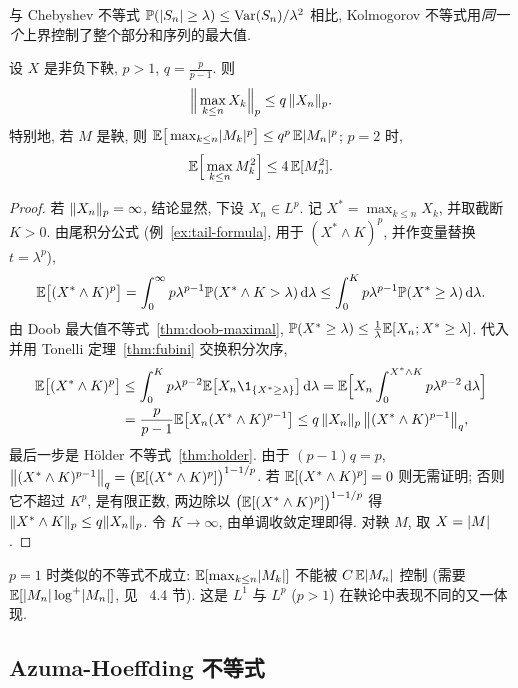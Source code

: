 与 Chebyshev 不等式 $\mathbb{P}(\lvert S_n\rvert\ge\lambda)\le\operatorname{Var}(S_n)/\lambda^2$ 相比, Kolmogorov 不等式用\emph{同一个}上界控制了整个部分和序列的最大值.

\begin{theorem}\label{thm:doob-Lp}
设 $X$ 是非负下鞅, $p>1$, $q=\frac{p}{p-1}$. 则
\[
\Big\|\max_{k\le n}X_k\Big\|_p\le q\,\lVert X_n\rVert_p.
\]
特别地, 若 $M$ 是鞅, 则 $\mathbb{E}\big[\max_{k\le n}\lvert M_k\rvert^p\big]\le q^p\,\mathbb{E}\lvert M_n\rvert^p$; $p=2$ 时,
\[
\mathbb{E}\Big[\max_{k\le n}M_k^2\Big]\le4\,\mathbb{E}[M_n^2].
\]
\end{theorem}

\begin{proof}
若 $\lVert X_n\rVert_p=\infty$, 结论显然, 下设 $X_n\in L^p$. 记 $X^*=\max_{k\le n}X_k$, 并取截断 $K>0$. 由尾积分公式 (例~\ref{ex:tail-formula}, 用于 $(X^*\wedge K)^p$, 并作变量替换 $t=\lambda^p$),
\[
\mathbb{E}\big[(X^*\wedge K)^p\big]=\int_0^\infty p\lambda^{p-1}\mathbb{P}(X^*\wedge K>\lambda)\mathop{}\!\mathrm{d}\lambda\le\int_0^Kp\lambda^{p-1}\mathbb{P}(X^*\ge\lambda)\mathop{}\!\mathrm{d}\lambda.
\]
由 Doob 最大值不等式~\ref{thm:doob-maximal}, $\mathbb{P}(X^*\ge\lambda)\le\frac{1}{\lambda}\mathbb{E}[X_n;X^*\ge\lambda]$. 代入并用 Tonelli 定理~\ref{thm:fubini} 交换积分次序,
\begin{align*}
\E\big[(X^*\wedge K)^p\big]&\le\int_0^Kp\lambda^{p-2}\E\big[X_n\1_{\{X^*\ge\lambda\}}\big]\dd\lambda=\E\Big[X_n\int_0^{X^*\wedge K}p\lambda^{p-2}\dd\lambda\Big]\\
&=\frac{p}{p-1}\E\big[X_n(X^*\wedge K)^{p-1}\big]\le q\,\norm{X_n}_p\,\big\|(X^*\wedge K)^{p-1}\big\|_q,
\end{align*}
最后一步是 H\"older 不等式~\ref{thm:holder}. 由于 $(p-1)q=p$, $\big\|(X^*\wedge K)^{p-1}\big\|_q=\big(\mathbb{E}[(X^*\wedge K)^p]\big)^{1-1/p}$. 若 $\mathbb{E}[(X^*\wedge K)^p]=0$ 则无需证明; 否则它不超过 $K^p$, 是有限正数, 两边除以 $\big(\mathbb{E}[(X^*\wedge K)^p]\big)^{1-1/p}$ 得
$\lVert X^*\wedge K\rVert_p\le q\lVert X_n\rVert_p$. 令 $K\to\infty$, 由单调收敛定理即得. 对鞅 $M$, 取 $X=\lvert M\rvert$.
\end{proof}

\begin{remark}
$p=1$ 时类似的不等式不成立: $\mathbb{E}[\max_{k\le n}\lvert M_k\rvert]$ 不能被 $C\,\mathbb{E}\lvert M_n\rvert$ 控制 (需要 $\mathbb{E}[\lvert M_n\rvert\log^+\lvert M_n\rvert]$, 见~\cite{durrett} 4.4 节). 这是 $L^1$ 与 $L^p$ ($p>1$) 在鞅论中表现不同的又一体现.
\end{remark}

\subsection{Azuma-Hoeffding 不等式}

